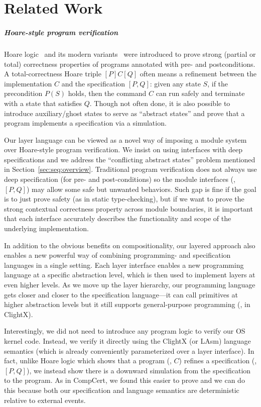 
\chapter{Related Work}
\label{chap-rel}

\paragraph{Hoare-style program verification} Hoare logic~\cite{hoare69}
and its modern variants~\cite{reynolds02,boogie05,nanevski06} were
introduced to prove strong (partial or total) correctness properties
of programs annotated with pre- and postconditions. A
total-correctness Hoare triple $[P]C[Q]$ often means a refinement
between the implementation $C$ and the specification $[P,Q]$: given
any state $S$, if the precondition $P(S)$ holds, then the command $C$
can run safely and terminate with a state that satisfies $Q$. Though
not often done, it is also possible to introduce auxiliary/ghost
states to serve as ``abstract states'' and prove that a program
implements a specification via a simulation.
  
Our layer language can be viewed as a novel way of imposing a module
system over Hoare-style program verification. We insist on using
interfaces with deep specifications and we address the ``conflicting
abstract states'' problem mentioned in
Section~\ref{sec:seq:overview}. Traditional program verification does not
always use deep specification (for pre- and post-conditions) so the
module interfaces (\eg, $[P,Q]$) may allow some safe but unwanted
behaviors. Such gap is fine if the goal is to just prove safety (as in
static type-checking), but if we want to prove the strong contextual
correctness property across module boundaries, it is important that
each interface accurately describes the functionality and scope of the
underlying implementation.

In addition to the obvious benefits on compositionality, our layered
approach also enables a new powerful way of combining programming- and
specification languages in a single setting. Each layer interface
enables a new programming language at a specific abstraction level,
which is then used to implement layers at even higher
levels. As we move up the layer hierarchy, our programming language
gets closer and closer to the specification language---it can call
primitives at higher abstraction levels but it still supports
general-purpose programming (\eg, in ClightX).

Interestingly, we did not need to introduce any program logic to
verify our OS kernel code. Instead, we verify it directly using the
ClightX (or LAsm) language semantics (which is already conveniently
parameterized over a layer interface).  In fact, unlike Hoare logic
which shows that a program (\eg, $C$) refines a specification (\eg,
$[P,Q]$), we instead show there is a downward simulation from the
specification to the program. As in CompCert, we found this easier to
prove and we can do this because both our specification and language
semantics are deterministic relative to external events.

